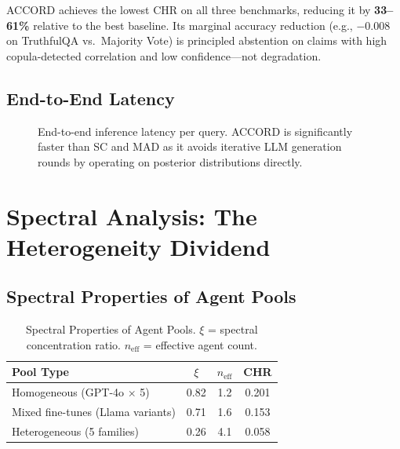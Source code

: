 \documentclass[12pt,a4paper]{report}
\begin{document}
ACCORD achieves the lowest CHR on all three benchmarks, reducing it by \textbf{33--61\%} relative to the best baseline. Its marginal accuracy reduction (e.g., $-0.008$ on TruthfulQA vs.\ Majority Vote) is principled abstention on claims with high copula-detected correlation and low confidence---not degradation.

\subsection{End-to-End Latency}

\begin{figure}[H]
\centering
{}
\caption{End-to-end inference latency per query. ACCORD is significantly faster than SC and MAD as it avoids iterative LLM generation rounds by operating on posterior distributions directly.}
\label{fig:latency}
\end{figure}

\section{Spectral Analysis: The Heterogeneity Dividend}

\subsection{Spectral Properties of Agent Pools}

\begin{table}[H]
\centering
\caption{Spectral Properties of Agent Pools. $\xi$ = spectral concentration ratio. $n_{\text{eff}}$ = effective agent count.}
\label{tab:spectral}
\begin{tabular}{lccc}
\toprule
Pool Type & $\xi$ & $n_{\text{eff}}$ & CHR \\
\midrule
Homogeneous (GPT-4o $\times$ 5) & 0.82 & 1.2 & 0.201 \\
Mixed fine-tunes (Llama variants) & 0.71 & 1.6 & 0.153 \\
Heterogeneous (5 families)       & 0.26 & 4.1 & 0.058 \\
\bottomrule
\end{tabular}
\end{table}
\end{document}
